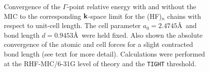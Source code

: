 \documentclass[prl,twocolumn,showpacs,twocolumngrid,superbib]{revtex4}
\begin{document}
\begin{figure}[h]
  \caption{Convergence of the $\Gamma$-point relative energy with and without the MIC to the corresponding 
    ${\bf k}$-space limit for the (HF)$_n$ chains with respect to unit-cell length. The cell parameter 
    $a_0=2.4745$\AA~and bond length $d=0.9453$\AA~were held fixed. 
    Also shown the absolute convergence of the atomic and cell forces for a slight contracted 
    bond length (see text for more detail).
    Calculations were performed at the RHF-MIC/6-31G level of theory and the {\tt TIGHT} threshold.}\label{Fig:CnvgEnergy}
\end{figure}
\end{document}
